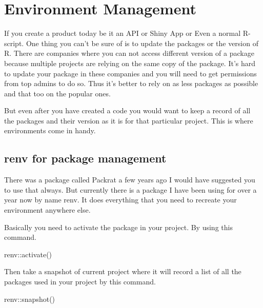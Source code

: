 \documentclass[
]{book}
\newenvironment{Shaded}{\begin{snugshade}}{\end{snugshade}}
\newcommand{\FunctionTok}[1]{\textcolor[rgb]{0.00,0.00,0.00}{#1}}
\newcommand{\NormalTok}[1]{#1}
\newcommand{\SpecialCharTok}[1]{\textcolor[rgb]{0.00,0.00,0.00}{#1}}
\begin{document}
\hypertarget{envManagement}{%
\chapter{Environment Management}\label{envManagement}}

If you create a product today be it an API or Shiny App or Even a normal R-script. One thing you can't be sure of is to update the packages or the version of R. There are companies where you can not access different version of a package because multiple projects are relying on the same copy of the package. It's hard to update your package in these companies and you will need to get permissions from top admins to do so. Thus it's better to rely on as less packages as possible and that too on the popular ones.

But even after you have created a code you would want to keep a record of all the packages and their version as it is for that particular project. This is where environments come in handy.

\hypertarget{renv-for-package-management}{%
\section{renv for package management}\label{renv-for-package-management}}

There was a package called Packrat a few years ago I would have suggested you to use that always. But currently there is a package I have been using for over a year now by name renv. It does everything that you need to recreate your environment anywhere else.

Basically you need to activate the package in your project. By using this command.

\begin{Shaded}
\begin{Highlighting}[]
\NormalTok{renv}\SpecialCharTok{::}\FunctionTok{activate}\NormalTok{()}
\end{Highlighting}
\end{Shaded}

Then take a snapshot of current project where it will record a list of all the packages used in your project by this command.

\begin{Shaded}
\begin{Highlighting}[]
\NormalTok{renv}\SpecialCharTok{::}\FunctionTok{snapshot}\NormalTok{()}
\end{Highlighting}
\end{Shaded}
\end{document}
